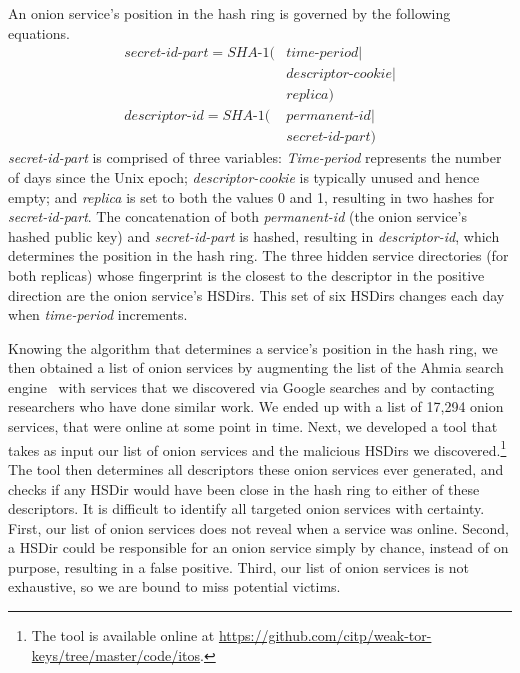 An onion service's position in the hash ring is governed by
the following equations.
\begin{equation}
\begin{split}
\textit{secret-id-part} = \textit{SHA-1}(& \textit{time-period} \mid \\
                                         & \textit{descriptor-cookie} \mid \\
                                         & \textit{replica}) \\
\textit{descriptor-id} =  \textit{SHA-1}(& \textit{permanent-id} \mid \\
                                         & \textit{secret-id-part})
\end{split}
\end{equation}
\textit{secret-id-part} is comprised of three variables:  \textit{Time-period}
represents the number of days since the Unix epoch; \textit{descriptor-cookie}
is typically unused and hence empty; and \textit{replica} is set to both the
values 0 and 1, resulting in two hashes for \textit{secret-id-part}.  
The concatenation of both \textit{permanent-id} (the onion service's hashed
public key) and \textit{secret-id-part} is hashed, resulting in
\textit{descriptor-id}, which determines the position in the hash ring.  The
three hidden service directories (for both replicas) whose fingerprint is the
closest to the descriptor in the positive direction are the onion service's HSDirs.
This set of six HSDirs changes each day when \textit{time-period} increments.

Knowing the algorithm that determines a service's position in the hash ring, we
then obtained a list of onion services by augmenting the list of the Ahmia
search engine~\cite{ahmia} with services that we discovered via Google searches
and by contacting researchers who have done similar work.  We ended up with a
list of 17,294 onion services, that were online at some point in time.  Next, we
developed a tool that takes as input our list of onion services and the
malicious HSDirs we discovered.\footnote{The tool is available online at
\url{https://github.com/citp/weak-tor-keys/tree/master/code/itos}.}  The tool
then determines all descriptors these onion services ever generated, and checks
if any HSDir would have been close in the hash ring to either of these
descriptors. It is difficult to identify all targeted onion services with
certainty.  First, our list of onion services does not reveal when a service was
online.  Second, a HSDir could be responsible for an onion service simply by
chance, instead of on purpose, resulting in a false positive.  Third, our list
of onion services is not exhaustive, so we are bound to miss potential victims.

